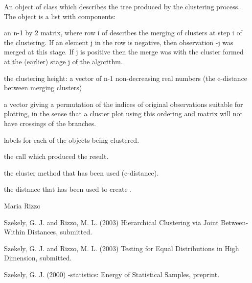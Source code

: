 \documentclass{article}
\begin{document}
\begin{Value}
An object of class  which describes the tree produced by
the clustering process. The object is a list with components: 
\begin{ldescription}
\item[\code{merge:}] an n-1 by 2 matrix, where row i of  describes the
merging of clusters at step i of the clustering. If an element j in the
row is negative, then observation -j was merged at this
stage. If j is positive then the merge was with the cluster
formed at the (earlier) stage j of the algorithm.
\item[\code{height:}] the clustering height: a vector of n-1 non-decreasing
real numbers (the e-distance between merging clusters)
\item[\code{order:}] a vector giving a permutation of the indices of 
original observations suitable for plotting, in the sense that a 
cluster plot using this ordering and matrix  will not have 
crossings of the branches.
\item[\code{labels:}] labels for each of the objects being clustered.
\item[\code{call:}] the call which produced the result.
\item[\code{method:}] the cluster method that has been used (e-distance).
\item[\code{dist.method:}] the distance that has been used to create .
\end{ldescription}
\end{Value}
\begin{Author}\relax
Maria Rizzo
\end{Author}
\begin{References}\relax
Szekely, G. J. and Rizzo, M. L. (2003) Hierarchical Clustering
via Joint Between-Within Distances, submitted.

Szekely, G. J. and Rizzo, M. L. (2003) Testing for Equal
Distributions in High Dimension, submitted.

Szekely, G. J. (2000) -statistics: Energy of
Statistical Samples, preprint.\end{References}
\begin{SeeAlso}\relax
{}  
\end{SeeAlso}
\end{document}
